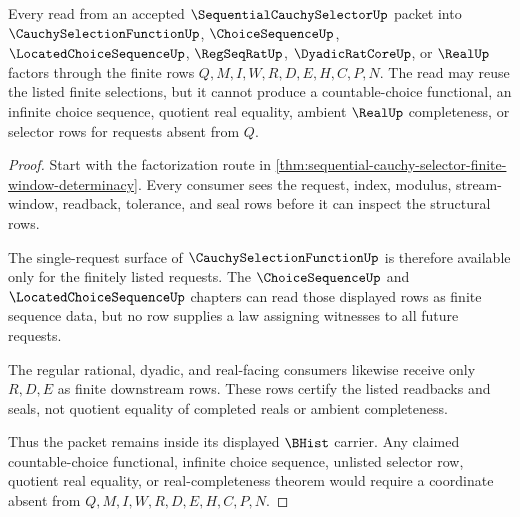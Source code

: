 \begin{theorem}
\label{thm:sequential-cauchy-selector-choice-boundary-nonescape}
Every read from an accepted $\SequentialCauchySelectorUp$ packet into $\CauchySelectionFunctionUp$, $\ChoiceSequenceUp$, $\LocatedChoiceSequenceUp$, $\RegSeqRatUp$, $\DyadicRatCoreUp$, or $\RealUp$ factors through the finite rows $Q,M,I,W,R,D,E,H,C,P,N$. The read may reuse the listed finite selections, but it cannot produce a countable-choice functional, an infinite choice sequence, quotient real equality, ambient $\RealUp$ completeness, or selector rows for requests absent from $Q$.
\end{theorem}
\begin{proof}
Start with the factorization route in \autoref{thm:sequential-cauchy-selector-finite-window-determinacy}. Every consumer sees the request, index, modulus, stream-window, readback, tolerance, and seal rows before it can inspect the structural rows.

The single-request surface of $\CauchySelectionFunctionUp$ is therefore available only for the finitely listed requests. The $\ChoiceSequenceUp$ and $\LocatedChoiceSequenceUp$ chapters can read those displayed rows as finite sequence data, but no row supplies a law assigning witnesses to all future requests.

The regular rational, dyadic, and real-facing consumers likewise receive only $R,D,E$ as finite downstream rows. These rows certify the listed readbacks and seals, not quotient equality of completed reals or ambient completeness.

Thus the packet remains inside its displayed $\BHist$ carrier. Any claimed countable-choice functional, infinite choice sequence, unlisted selector row, quotient real equality, or real-completeness theorem would require a coordinate absent from $Q,M,I,W,R,D,E,H,C,P,N$.
\end{proof}


